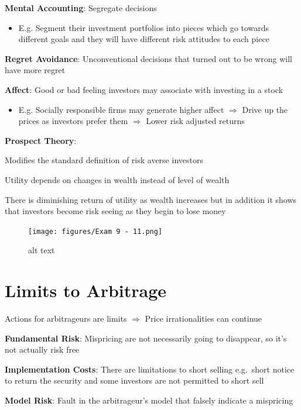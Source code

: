 \documentclass[]{book}
\providecommand{\tightlist}{%
  \setlength{\itemsep}{0pt}\setlength{\parskip}{0pt}}
\theoremstyle{definition}
\theoremstyle{definition}
\theoremstyle{remark}
\begin{document}
\textbf{Mental Accounting}: Segregate decisions

\begin{itemize}
\tightlist
\item
  E.g. Segment their investment portfolios into pieces which go towards
  different goals and they will have different risk attitudes to each
  piece
\end{itemize}

\textbf{Regret Avoidance}: Unconventional decisions that turned out to
be wrong will have more regret

\textbf{Affect}: Good or bad feeling investors may associate with
investing in a stock

\begin{itemize}
\tightlist
\item
  E.g. Socially responsible firms may generate higher affect
  \(\Rightarrow\) Drive up the prices as investors prefer them
  \(\Rightarrow\) Lower risk adjusted returns
\end{itemize}

\textbf{Prospect Theory}:

Modifies the standard definition of risk averse investors

Utility depends on changes in wealth instead of level of wealth

There is diminishing return of utility as wealth increases but in
addition it shows that investors become risk seeing as they begin to
lose money

\begin{figure}[htbp]
\centering
\texttt{[image: figures/Exam 9 - 11.png]}
\caption{alt text}
\end{figure}

\section{Limits to Arbitrage}\label{limits-to-arbitrage}

Actions for arbitrageurs are limits \(\Rightarrow\) Price
irrationalities can continue

\textbf{Fundamental Risk}: Mispricing are not necessarily going to
disappear, so it's not actually risk free

\textbf{Implementation Costs}: There are limitations to short selling
e.g.~short notice to return the security and some investors are not
permitted to short sell

\textbf{Model Risk}: Fault in the arbitrageur's model that falsely
indicate a mispricing
\end{document}
